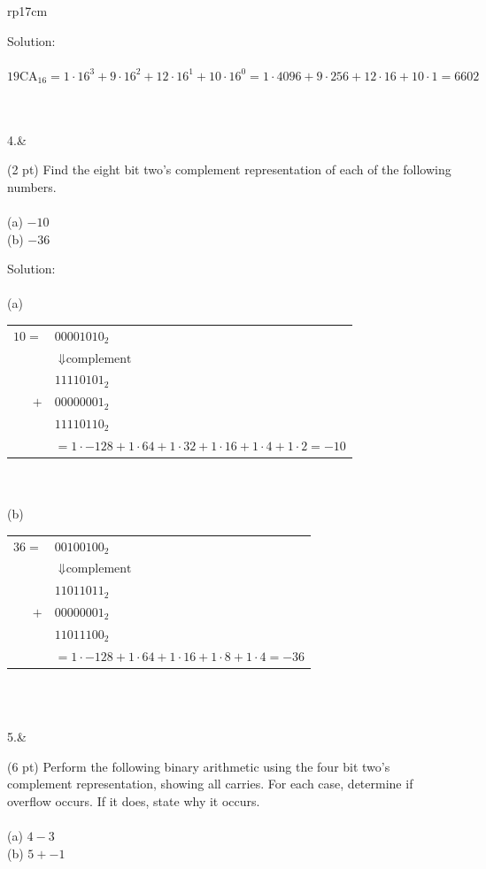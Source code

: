 \documentclass{article}
\begin{document}
\begin{longtable}[l]{rp{17cm}}
\begin{minipage}[t]{\linewidth}
Solution: \\
\\
$19\textrm{CA}_{16} = 1 \cdot 16^3 + 9 \cdot 16^2 + 12 \cdot 16^1 + 10 \cdot 16^0 = 1 \cdot 4096 + 9 \cdot 256 + 12 \cdot 16 + 10 \cdot 1 = 6602$ \\
\\
\end{minipage}\\
\medskip
4.&\begin{minipage}[t]{\linewidth}(2 pt) Find the eight bit two's complement representation of each of the following numbers. \\
\\
(a) $-10$\\
(b) $-36$

Solution: \\
\\
(a)\\
\begin{tabular}{rl}
  $10 =$ & $00001010_2$\\
         & $\Downarrow \textrm{complement}$\\
         & $11110101_2$\\
     $+$ & $00000001_2$\\
         & $11110110_2$\\
         & $= 1 \cdot -128 + 1 \cdot 64 + 1 \cdot 32 + 1 \cdot 16 + 1 \cdot 4 + 1 \cdot 2= -10$
\end{tabular}\\
\\
(b)\\
\begin{tabular}{rl}
  $36 =$ & $00100100_2$\\
         & $\Downarrow \textrm{complement}$\\
         & $11011011_2$\\
     $+$ & $00000001_2$\\
         & $11011100_2$\\
         & $= 1 \cdot -128 + 1 \cdot 64 + 1 \cdot 16 + 1 \cdot 8 + 1 \cdot 4 = -36$
\end{tabular}\\
\end{minipage}\\
\medskip
5.&\begin{minipage}[t]{\linewidth}(6 pt) Perform the following binary arithmetic using the four bit two's complement representation, showing all carries.  For each case, determine if overflow occurs. If it does, state why it occurs.
\\
\\
(a) $4 - 3$\\
(b) $5 + -1$\\


\end{minipage}
\end{longtable}
\end{document}
